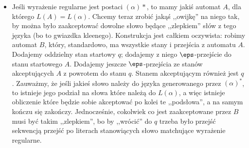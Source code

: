 \begin{itemize}
        \item Jeśli wyrażenie regularne jest postaci \((\alpha)*\), to mamy jakiś automat \(A\), dla którego \(L(A) = L(\alpha)\). Chcemy teraz zrobić jakąś ,,owijkę'' na niego tak, by można było zaakceptować dowolne słowo będące ,,zlepkiem'' słów z tego języka (bo to gwiazdka kleenego). Konstrukcja jest całkiem oczywista: robimy automat \(B\), który, standardowo, ma wszystkie stany i przejścia z automatu \(A\). Dodajemy oddzielny stan startowy \(q\); dodajemy z niego \(\eps\)-przejście do stanu startowego \(A\). Dodajemy jeszcze \(\eps\)-przejścia ze stanów akceptujących \(A\) z powrotem do stanu \(q\). Stanem akceptującym również jest \(q\). Zauważmy, że jeśli jakieś słowo należy do języka generowanego przez \((\alpha)^*\), to istnieje jego podział na słowa które należą do \(L(\alpha)\), a więc istnieje obliczenie które będzie sobie akceptować po kolei te ,,podsłowa'', a na samym kończu się zakończy. Jednocześnie, cokolwiek co jest zaakceptowane przez \(B\) musi być takim ,,zlepkiem'', bo by ,,wrócić'' do \(q\) trzeba było przejść sekwencją przejść po literach stanowiących słowo matchujące wyrażenie regularne.
    \end{itemize}
